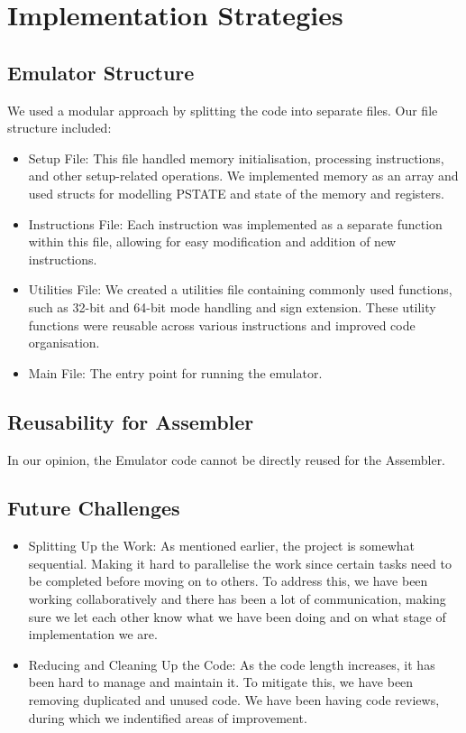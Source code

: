 \documentclass[11pt]{article}
\begin{document}
\section{Implementation Strategies}

\subsection*{Emulator Structure}

We used a modular approach by splitting the code into separate files. Our file structure included:
\begin{itemize}
    \item Setup File: This file handled memory initialisation, processing instructions, and other setup-related operations. 
        We implemented memory as an array and used structs for modelling PSTATE and state of the memory and registers.
    \item Instructions File: Each instruction was implemented as a separate function within this file, allowing for easy 
        modification and addition of new instructions.
    \item Utilities File: We created a utilities file containing commonly used functions, such as 32-bit and 64-bit mode handling 
        and sign extension. These utility functions were reusable across various instructions and improved code organisation.
    \item Main File: The entry point for running the emulator.
\end{itemize}

\subsection*{Reusability for Assembler}
In our opinion, the Emulator code cannot be directly reused for the Assembler.

\subsection*{Future Challenges}
\begin{itemize}
    \item Splitting Up the Work: As mentioned earlier, the project is somewhat sequential. 
    Making it hard to parallelise the work since certain tasks need to be completed before moving on to others. 
    To address this, we have been working collaboratively and there has been a lot of communication, making sure we let each other know
    what we have been doing and on what stage of implementation we are.
    \item Reducing and Cleaning Up the Code: As the code length increases, it has been hard to manage and maintain it. To mitigate this,
    we have been removing duplicated and unused code. We have been having code reviews, during which we indentified areas of improvement.
\end{itemize}
\end{document}

